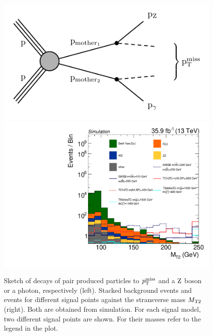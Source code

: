 \begin{figure}
 \centering
 \includegraphics[width=\pairwidth]{figures/mt2/graph}
 \includegraphics[width=\pairwidth]{figures/plots/onZ_LL_mt2_log}
 \caption{Sketch of decays of pair produced particles to $p_{\mathrm{T}}^\text{miss}$ and a $\mathrm{Z}$ boson or a photon, respectively (left). Stacked background events and events for different signal points against the stransverse mass $M_{\mathrm{T2}}$ (right). Both are obtained from simulation. For each signal model, two different signal points are shown. For their masses refer to the legend in the plot.}
 \label{fig:mt2}
\end{figure}


